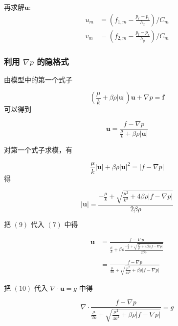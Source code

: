\documentclass[leqno]{article}
\begin{document}
再求解$\boldsymbol{u}$:
\begin{equation*}
\begin{aligned}
u_m & = (f_{1,m} - \frac{p_{r} - p_{l}}{h_x})/C_m \\
v_m & = (f_{2,m} - \frac{p_{l} - p_{r}}{h_y})/C_m
\end{aligned}
\end{equation*}

\subsubsection{利用 $\nabla p$ 的隐格式}
由模型中的第一个式子 

\begin{equation}
(\frac{\mu}{k} + \beta\rho|\boldsymbol{u}|)\boldsymbol{u} + \nabla p = \boldsymbol{f}
\end{equation}
可以得到

\begin{equation}
\boldsymbol{u} = \frac{f - \nabla p}{\frac{\mu}{k} + \beta\rho|\boldsymbol{u}|}
\end{equation}

对第一个式子求模，有

\begin{equation}
\frac{\mu}{k}|\boldsymbol{u}| + \beta\rho|\boldsymbol{u}|^2 = |f - \nabla p|
\end{equation}
得

\begin{equation}
|\boldsymbol{u}| = \frac{-\frac{\mu}{k} + \sqrt{\frac{\mu^2}{k^2} + 4\beta\rho|f-\nabla p|}}{2\beta\rho}
\end{equation}

把 $(9)$ 代入 $(7)$ 中得

\begin{equation}
\begin{aligned}
\boldsymbol{u} & = \frac{f - \nabla p}{\frac{\mu}{k} + \beta\rho\frac{-\frac{\mu}{k} + \sqrt{\frac{\mu^2}{k^2} + 4\beta\rho|f-\nabla p|}}{2\beta\rho}}\\
& \\
& = \frac{f - \nabla p}{\frac{\mu}{2k} + \sqrt{\frac{\mu^2}{4k^2} + \beta\rho|f-\nabla p|}}
\end{aligned}
\end{equation}

把 $(10)$ 代入 $\nabla \cdot \boldsymbol{u} = g$ 中得

\begin{equation}
\nabla\cdot\frac{f - \nabla p}{\frac{\mu}{2k} + \sqrt{\frac{\mu^2}{4k^2} + \beta\rho|f-\nabla p|}} = g
\end{equation}
\end{document}
